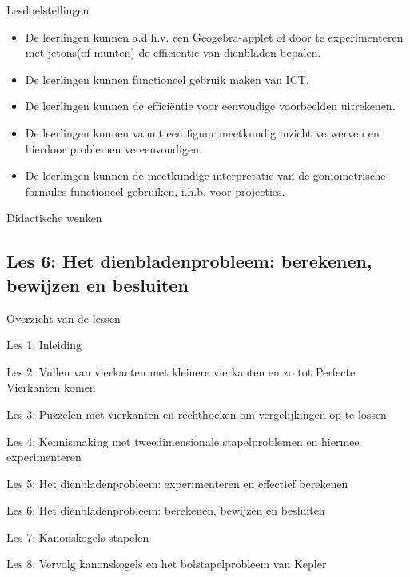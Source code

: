 \documentclass[dutch]{beamer}
\begin{document}
\begin{frame}{Lesdoelstellingen}
\begin{itemize}
\item De leerlingen kunnen a.d.h.v. een Geogebra-applet of door te experimenteren met jetons(of munten) de effici\"{e}ntie van dienbladen bepalen.
\item De leerlingen kunnen functioneel gebruik maken van ICT.
\item De leerlingen kunnen de effici\"{e}ntie voor eenvoudige voorbeelden uitrekenen.
\item De leerlingen kunnen vanuit een figuur meetkundig inzicht verwerven en hierdoor problemen vereenvoudigen.
\item De leerlingen kunnen de meetkundige interpretatie van de goniometrische formules functioneel gebruiken, i.h.b. voor projecties.
\end{itemize}
\end{frame}

\begin{frame}{Didactische wenken}
\end{frame}


\subsection{Les 6: Het dienbladenprobleem: berekenen, bewijzen en besluiten}
\begin{frame}
{Overzicht van de lessen}
\begin{list}{\quad}{}
\item Les 1: Inleiding
\item Les 2: Vullen van vierkanten met kleinere vierkanten en zo tot Perfecte Vierkanten komen
\item Les 3: Puzzelen met vierkanten en rechthoeken om vergelijkingen op te lossen
\item Les 4: Kennismaking met tweedimensionale stapelproblemen en hiermee experimenteren
\item Les 5: Het dienbladenprobleem: experimenteren en effectief berekenen
\item {\color{blue}Les 6: Het dienbladenprobleem: berekenen, bewijzen en besluiten}
\item Les 7: Kanonskogels stapelen
\item Les 8: Vervolg kanonskogels en het bolstapelprobleem van Kepler
\end{list}
\end{frame}
\end{document}
